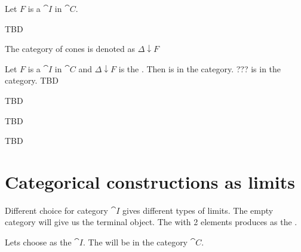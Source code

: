 \begin{definition}
\label{def:category_of_cones}
Let $F$ is a  $\cat{I}$ in $\cat{C}$.

TBD

The category of cones is denoted as $\Delta \downarrow F$ \cite{wiki:cone}
\end{definition}

\begin{remark}
\label{rem:category_of_cones}
Let $F$ is a  $\cat{I}$ in $\cat{C}$
and $\Delta \downarrow F$ is the .
Then  is  in the
category. ???  is  in the
category. 
TBD
\end{remark}

\begin{definition}[Co-cone]
\label{def:cocone}
TBD
\end{definition}

\begin{definition}[Colimit]
\label{def:colimit}
TBD
\end{definition}


TBD

\section{Categorical constructions as limits}

Different choice for category $\cat{I}$ gives different types of
limits. The empty category will give us the terminal object. The
 with 2 elements produces
 as the .

\begin{example}
Lets choose  as the
 $\cat{I}$. The 
will be  in the category $\cat{C}$.
\end{example}

